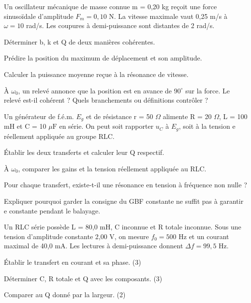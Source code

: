 \label{ex-D2}
Un oscillateur mécanique de masse connue m = 0,20 kg reçoit une force sinusoïdale d’amplitude $F_m=0{,}10$ N. La vitesse maximale vaut 0,25 m/s à $\omega=10$ rad/s. Les coupures à demi-puissance sont distantes de 2 rad/s.\begin{questions}
\item Déterminer b, k et Q de deux manières cohérentes.
\item Prédire la position du maximum de déplacement et son amplitude.
\item Calculer la puissance moyenne reçue à la résonance de vitesse.
\item À $\omega_0$, un relevé annonce que la position est en avance de $90^\circ$ sur la force. Le relevé est-il cohérent ? Quels branchements ou définitions contrôler ?
\end{questions}


\label{ex-D3}
Un générateur de f.é.m. $E_g$ et de résistance r = 50 $\Omega$ alimente R = 20 $\Omega$, L = 100 mH et C = 10 $\mu\mathrm F$ en série. On peut soit rapporter $u_C$ à $E_g$, soit à la tension e réellement appliquée au groupe RLC.\begin{questions}
\item Établir les deux transferts et calculer leur Q respectif.
\item À $\omega_0$, comparer les gains et la tension réellement appliquée au RLC.
\item Pour chaque transfert, existe-t-il une résonance en tension à fréquence non nulle ?
\item Expliquer pourquoi garder la consigne du GBF constante ne suffit pas à garantir e constante pendant le balayage.
\end{questions}


Un RLC série possède L = 80,0 mH, C inconnue et R totale inconnue. Sous une tension d’amplitude constante 2,00 V, on mesure $f_0=500$ Hz et un courant maximal de 40,0 mA. Les lectures à demi-puissance donnent $\Delta f=99{,}5$ Hz.
\begin{questions}
\item Établir le transfert en courant et sa phase. (3)
\item Déterminer C, R totale et Q avec les composants. (3)
\item Comparer au Q donné par la largeur. (2)
\end{questions}

